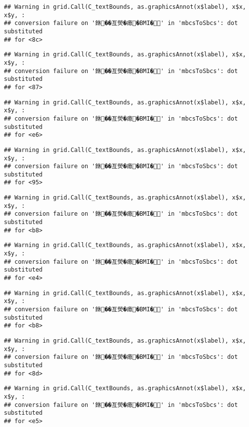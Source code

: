 \documentclass[
]{article}
\begin{document}
\begin{verbatim}
## Warning in grid.Call(C_textBounds, as.graphicsAnnot(x$label), x$x, x$y, :
## conversion failure on '銝��亙熒�瘜�BMI�' in 'mbcsToSbcs': dot substituted
## for <8c>
\end{verbatim}

\begin{verbatim}
## Warning in grid.Call(C_textBounds, as.graphicsAnnot(x$label), x$x, x$y, :
## conversion failure on '銝��亙熒�瘜�BMI�' in 'mbcsToSbcs': dot substituted
## for <87>
\end{verbatim}

\begin{verbatim}
## Warning in grid.Call(C_textBounds, as.graphicsAnnot(x$label), x$x, x$y, :
## conversion failure on '銝��亙熒�瘜�BMI�' in 'mbcsToSbcs': dot substituted
## for <e6>
\end{verbatim}

\begin{verbatim}
## Warning in grid.Call(C_textBounds, as.graphicsAnnot(x$label), x$x, x$y, :
## conversion failure on '銝��亙熒�瘜�BMI�' in 'mbcsToSbcs': dot substituted
## for <95>
\end{verbatim}

\begin{verbatim}
## Warning in grid.Call(C_textBounds, as.graphicsAnnot(x$label), x$x, x$y, :
## conversion failure on '銝��亙熒�瘜�BMI�' in 'mbcsToSbcs': dot substituted
## for <b8>
\end{verbatim}

\begin{verbatim}
## Warning in grid.Call(C_textBounds, as.graphicsAnnot(x$label), x$x, x$y, :
## conversion failure on '銝��亙熒�瘜�BMI�' in 'mbcsToSbcs': dot substituted
## for <e4>
\end{verbatim}

\begin{verbatim}
## Warning in grid.Call(C_textBounds, as.graphicsAnnot(x$label), x$x, x$y, :
## conversion failure on '銝��亙熒�瘜�BMI�' in 'mbcsToSbcs': dot substituted
## for <b8>
\end{verbatim}

\begin{verbatim}
## Warning in grid.Call(C_textBounds, as.graphicsAnnot(x$label), x$x, x$y, :
## conversion failure on '銝��亙熒�瘜�BMI�' in 'mbcsToSbcs': dot substituted
## for <8d>
\end{verbatim}

\begin{verbatim}
## Warning in grid.Call(C_textBounds, as.graphicsAnnot(x$label), x$x, x$y, :
## conversion failure on '銝��亙熒�瘜�BMI�' in 'mbcsToSbcs': dot substituted
## for <e5>
\end{verbatim}
\end{document}
